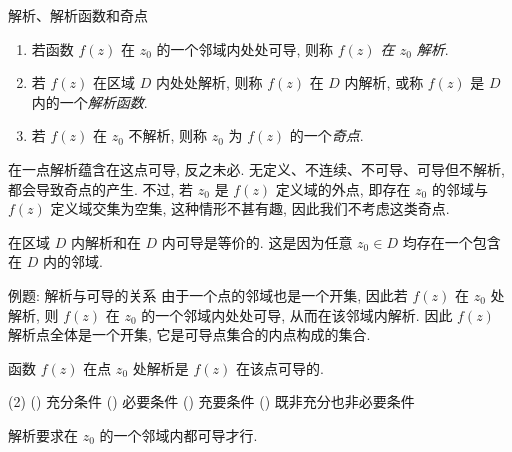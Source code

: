\begin{frame}{解析、解析函数和奇点}
	\onslide<+->
	\begin{definition}
		\begin{enumerate}
			\item 若函数 $f(z)$ 在 $z_0$ 的一个邻域内处处可导, 则称 \emph{$f(z)$ 在 $z_0$ 解析}.
			\item 若 $f(z)$ 在区域 $D$ 内处处解析, 则称 $f(z)$ 在 $D$ 内解析, 或称 $f(z)$ 是 $D$ 内的一个\emph{解析函数}.
			\item 若 $f(z)$ 在 $z_0$ 不解析, 则称 $z_0$ 为 $f(z)$ 的一个\emph{奇点}.
		\end{enumerate}
	\end{definition}
	\onslide<+->
	\alert{在一点解析蕴含在这点可导, 反之未必.} 
	\onslide<+->
	无定义、不连续、不可导、可导但不解析, 都会导致奇点的产生.
	\onslide<+->
	不过, 若 $z_0$ 是 $f(z)$ 定义域的外点, 即存在 $z_0$ 的邻域与 $f(z)$ 定义域交集为空集, 这种情形不甚有趣, 因此我们不考虑这类奇点.

	\onslide<+->
	\alert{在区域 $D$ 内解析和在 $D$ 内可导是等价的.} 
	\onslide<+->
	这是因为任意 $z_0\in D$ 均存在一个包含在 $D$ 内的邻域.
\end{frame}


\begin{frame}{例题: 解析与可导的关系}
	\onslide<+->
	由于一个点的邻域也是一个开集, 因此若 $f(z)$ 在 $z_0$ 处解析, 则 $f(z)$ 在 $z_0$ 的一个邻域内处处可导, 从而在该邻域内解析. 
	\onslide<+->
	因此 \alert{$f(z)$ 解析点全体是一个开集}, 它是可导点集合的内点构成的集合.
	\onslide<+->
	\begin{exercise}[nearnext]
		函数 $f(z)$ 在点 $z_0$ 处解析是 $f(z)$ 在该点可导的.
		\begin{exchoice}(2)
			() 充分条件
			() 必要条件
			() 充要条件
			() 既非充分也非必要条件
		\end{exchoice}
	\end{exercise}
	\onslide<+->
	\begin{answer}[nearprev]
		解析要求在 $z_0$ 的一个邻域内都可导才行.
	\end{answer}
\end{frame}


